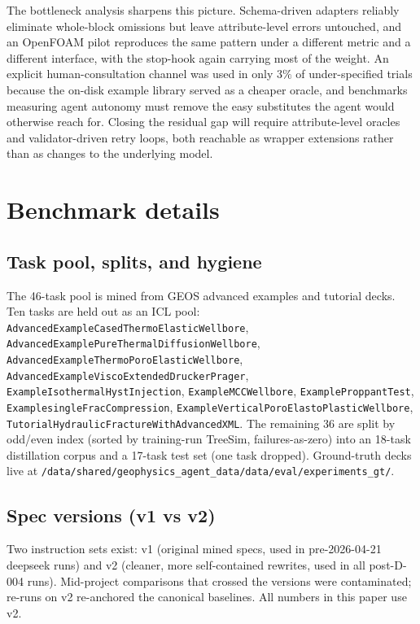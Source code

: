 \documentclass{article}
\begin{document}
The bottleneck analysis sharpens this picture. Schema-driven adapters reliably eliminate whole-block omissions but leave attribute-level errors untouched, and an OpenFOAM pilot reproduces the same pattern under a different metric and a different interface, with the stop-hook again carrying most of the weight. An explicit human-consultation channel was used in only $3\%$ of under-specified trials because the on-disk example library served as a cheaper oracle, and benchmarks measuring agent autonomy must remove the easy substitutes the agent would otherwise reach for. Closing the residual gap will require attribute-level oracles and validator-driven retry loops, both reachable as wrapper extensions rather than as changes to the underlying model.

\medskip

{
\small
}





\appendix

\section{Benchmark details}
\label{app:bench}

\subsection{Task pool, splits, and hygiene}
The 46-task pool is mined from GEOS advanced examples and tutorial decks. Ten tasks are held out as an ICL pool: \texttt{AdvancedExampleCasedThermoElasticWellbore}, \texttt{AdvancedExamplePureThermalDiffusionWellbore}, \texttt{AdvancedExampleThermoPoroElasticWellbore}, \texttt{AdvancedExampleViscoExtendedDruckerPrager}, \texttt{ExampleIsothermalHystInjection}, \texttt{ExampleMCCWellbore}, \texttt{ExampleProppantTest}, \texttt{ExamplesingleFracCompression}, \texttt{ExampleVerticalPoroElastoPlasticWellbore}, \texttt{TutorialHydraulicFractureWithAdvancedXML}. The remaining 36 are split by odd/even index (sorted by training-run TreeSim, failures-as-zero) into an 18-task distillation corpus and a 17-task test set (one task dropped). Ground-truth decks live at \texttt{/data/shared/geophysics\_agent\_data/data/eval/experiments\_gt/}.

\subsection{Spec versions (v1 vs v2)}
Two instruction sets exist: v1 (original mined specs, used in pre-2026-04-21 deepseek runs) and v2 (cleaner, more self-contained rewrites, used in all post-D-004 runs). Mid-project comparisons that crossed the versions were contaminated; re-runs on v2 re-anchored the canonical baselines. All numbers in this paper use v2.
\end{document}
